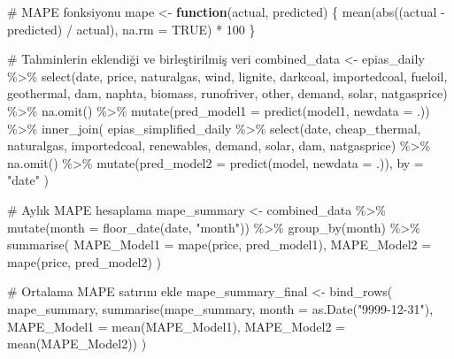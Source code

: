 \documentclass[
]{article}
\newenvironment{Shaded}{\begin{snugshade}}{\end{snugshade}}
\newcommand{\AttributeTok}[1]{\textcolor[rgb]{0.40,0.45,0.13}{#1}}
\newcommand{\CommentTok}[1]{\textcolor[rgb]{0.37,0.37,0.37}{#1}}
\newcommand{\ConstantTok}[1]{\textcolor[rgb]{0.56,0.35,0.01}{#1}}
\newcommand{\ControlFlowTok}[1]{\textcolor[rgb]{0.00,0.23,0.31}{\textbf{#1}}}
\newcommand{\DecValTok}[1]{\textcolor[rgb]{0.68,0.00,0.00}{#1}}
\newcommand{\FunctionTok}[1]{\textcolor[rgb]{0.28,0.35,0.67}{#1}}
\newcommand{\NormalTok}[1]{\textcolor[rgb]{0.00,0.23,0.31}{#1}}
\newcommand{\OtherTok}[1]{\textcolor[rgb]{0.00,0.23,0.31}{#1}}
\newcommand{\SpecialCharTok}[1]{\textcolor[rgb]{0.37,0.37,0.37}{#1}}
\newcommand{\StringTok}[1]{\textcolor[rgb]{0.13,0.47,0.30}{#1}}
\begin{document}
\begin{Shaded}
\begin{Highlighting}[]
\CommentTok{\# MAPE fonksiyonu}
\NormalTok{mape }\OtherTok{\textless{}{-}} \ControlFlowTok{function}\NormalTok{(actual, predicted) \{}
  \FunctionTok{mean}\NormalTok{(}\FunctionTok{abs}\NormalTok{((actual }\SpecialCharTok{{-}}\NormalTok{ predicted) }\SpecialCharTok{/}\NormalTok{ actual), }\AttributeTok{na.rm =} \ConstantTok{TRUE}\NormalTok{) }\SpecialCharTok{*} \DecValTok{100}
\NormalTok{\}}

\CommentTok{\# Tahminlerin eklendiği ve birleştirilmiş veri}
\NormalTok{combined\_data }\OtherTok{\textless{}{-}}\NormalTok{ epias\_daily }\SpecialCharTok{\%\textgreater{}\%}
  \FunctionTok{select}\NormalTok{(date, price,}
\NormalTok{         naturalgas, wind, lignite, darkcoal, importedcoal, fueloil,}
\NormalTok{         geothermal, dam, naphta, biomass, runofriver, other, demand, solar, natgasprice) }\SpecialCharTok{\%\textgreater{}\%}
  \FunctionTok{na.omit}\NormalTok{() }\SpecialCharTok{\%\textgreater{}\%}
  \FunctionTok{mutate}\NormalTok{(}\AttributeTok{pred\_model1 =} \FunctionTok{predict}\NormalTok{(model1, }\AttributeTok{newdata =}\NormalTok{ .)) }\SpecialCharTok{\%\textgreater{}\%}
  \FunctionTok{inner\_join}\NormalTok{(}
\NormalTok{    epias\_simplified\_daily }\SpecialCharTok{\%\textgreater{}\%}
      \FunctionTok{select}\NormalTok{(date,}
\NormalTok{             cheap\_thermal, naturalgas, importedcoal, renewables, demand, solar, dam, natgasprice) }\SpecialCharTok{\%\textgreater{}\%}
      \FunctionTok{na.omit}\NormalTok{() }\SpecialCharTok{\%\textgreater{}\%}
      \FunctionTok{mutate}\NormalTok{(}\AttributeTok{pred\_model2 =} \FunctionTok{predict}\NormalTok{(model, }\AttributeTok{newdata =}\NormalTok{ .)),}
    \AttributeTok{by =} \StringTok{"date"}
\NormalTok{  )}

\CommentTok{\# Aylık MAPE hesaplama}
\NormalTok{mape\_summary }\OtherTok{\textless{}{-}}\NormalTok{ combined\_data }\SpecialCharTok{\%\textgreater{}\%}
  \FunctionTok{mutate}\NormalTok{(}\AttributeTok{month =} \FunctionTok{floor\_date}\NormalTok{(date, }\StringTok{"month"}\NormalTok{)) }\SpecialCharTok{\%\textgreater{}\%}
  \FunctionTok{group\_by}\NormalTok{(month) }\SpecialCharTok{\%\textgreater{}\%}
  \FunctionTok{summarise}\NormalTok{(}
    \AttributeTok{MAPE\_Model1 =} \FunctionTok{mape}\NormalTok{(price, pred\_model1),}
    \AttributeTok{MAPE\_Model2 =} \FunctionTok{mape}\NormalTok{(price, pred\_model2)}
\NormalTok{  )}

\CommentTok{\# Ortalama MAPE satırını ekle}
\NormalTok{mape\_summary\_final }\OtherTok{\textless{}{-}} \FunctionTok{bind\_rows}\NormalTok{(}
\NormalTok{  mape\_summary,}
  \FunctionTok{summarise}\NormalTok{(mape\_summary,}
            \AttributeTok{month =} \FunctionTok{as.Date}\NormalTok{(}\StringTok{"9999{-}12{-}31"}\NormalTok{),}
            \AttributeTok{MAPE\_Model1 =} \FunctionTok{mean}\NormalTok{(MAPE\_Model1),}
            \AttributeTok{MAPE\_Model2 =} \FunctionTok{mean}\NormalTok{(MAPE\_Model2))}
\NormalTok{)}


\end{Highlighting}
\end{Shaded}
\end{document}
